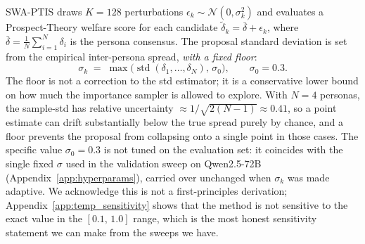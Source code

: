 \documentclass{article}
\begin{document}
SWA-PTIS draws $K{=}128$ perturbations
$\epsilon_k \sim \mathcal{N}(0,\sigma_k^2)$ and evaluates a Prospect-Theory
welfare score for each candidate $\tilde{\delta}_k = \bar{\delta} + \epsilon_k$,
where $\bar{\delta} = \tfrac{1}{N}\sum_{i=1}^{N}\delta_i$ is the persona consensus.
The proposal standard deviation is set from the empirical inter-persona
spread, \emph{with a fixed floor}:
\begin{equation}
  \sigma_k \;=\; \max\!\bigl(\operatorname{std}(\delta_1,\ldots,\delta_N),\,\sigma_0\bigr),
  \qquad \sigma_0 = 0.3.
  \label{eq:sigma_floor}
\end{equation}
The floor is not a correction to the std estimator; it is a conservative
lower bound on how much the importance sampler is allowed to explore. With
$N{=}4$ personas, the sample-std has relative uncertainty
$\approx 1/\sqrt{2(N-1)}\approx 0.41$, so a point estimate can drift
substantially below the true spread purely by chance, and a floor prevents
the proposal from collapsing onto a single point in those cases.
The specific value $\sigma_0{=}0.3$ is not tuned on the evaluation set: it
coincides with the single fixed $\sigma$ used in the validation sweep on
Qwen2.5-72B (Appendix~\ref{app:hyperparams}), carried over unchanged when
$\sigma_k$ was made adaptive. We acknowledge this is not a
first-principles derivation; Appendix~\ref{app:temp_sensitivity} shows that
the method is not sensitive to the exact value in the $[0.1,\,1.0]$ range,
which is the most honest sensitivity statement we can make from the sweeps
we have.
\end{document}
